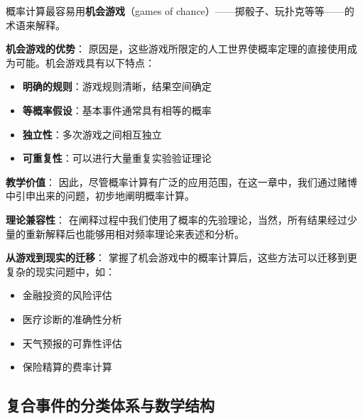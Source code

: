 \begin{examplebox}[title=机会游戏作为概率计算的理想模型]
概率计算最容易用\textbf{机会游戏}（games of chance）——掷骰子、玩扑克等等——的术语来解释。

\textbf{机会游戏的优势}：
原因是，这些游戏所限定的人工世界使概率定理的直接使用成为可能。机会游戏具有以下特点：
\begin{itemize}
\item \textbf{明确的规则}：游戏规则清晰，结果空间确定
\item \textbf{等概率假设}：基本事件通常具有相等的概率
\item \textbf{独立性}：多次游戏之间相互独立
\item \textbf{可重复性}：可以进行大量重复实验验证理论
\end{itemize}

\textbf{教学价值}：
因此，尽管概率计算有广泛的应用范围，在这一章中，我们通过赌博中引申出来的问题，初步地阐明概率计算。

\textbf{理论兼容性}：
在阐释过程中我们使用了概率的先验理论，当然，所有结果经过少量的重新解释后也能够用相对频率理论来表述和分析。

\textbf{从游戏到现实的迁移}：
掌握了机会游戏中的概率计算后，这些方法可以迁移到更复杂的现实问题中，如：
\begin{itemize}
\item 金融投资的风险评估
\item 医疗诊断的准确性分析
\item 天气预报的可靠性评估
\item 保险精算的费率计算
\end{itemize}
\end{examplebox}

\subsection{复合事件的分类体系与数学结构}

